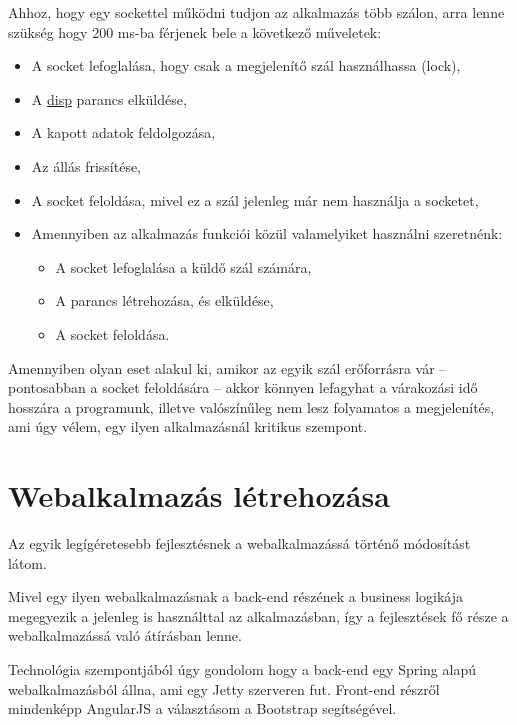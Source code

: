 \documentclass[a4paper,12pt]{report}
\begin{document}
\vspace{2mm}
Ahhoz, hogy egy sockettel működni tudjon az alkalmazás több szálon, arra lenne szükség hogy 200 ms-ba férjenek bele a következő műveletek:

\begin{itemize}
\item A socket lefoglalása, hogy csak a megjelenítő szál használhassa (lock),
\item A \url{disp} parancs elküldése,
\item A kapott adatok feldolgozása,
\item Az állás frissítése,
\item A socket feloldása, mivel ez a szál jelenleg már nem használja a socketet,
\item Amennyiben az alkalmazás funkciói közül valamelyiket használni szeretnénk:
	\begin{itemize}
	\item A socket lefoglalása a küldő szál számára,
	\item A parancs létrehozása, és elküldése,
	\item A socket feloldása.
	\end{itemize}
\end{itemize}

\vspace{2mm}
Amennyiben olyan eset alakul ki, amikor az egyik szál erőforrásra vár -- pontosabban a socket feloldására -- akkor könnyen lefagyhat a várakozási idő hosszára a programunk, illetve valószínűleg nem lesz folyamatos a megjelenítés, ami úgy vélem, egy ilyen alkalmazásnál kritikus szempont.

\section{Webalkalmazás létrehozása}

Az egyik legígéretesebb fejlesztésnek a webalkalmazássá történő módosítást látom.

\vspace{2mm}
Mivel egy ilyen webalkalmazásnak a back-end részének a business logikája megegyezik a jelenleg is használttal az alkalmazásban, így a fejlesztések fő része a webalkalmazássá való átírásban lenne.

\vspace{2mm}
Technológia szempontjából úgy gondolom hogy a back-end egy Spring \cite{spring} alapú webalkalmazásból állna, ami egy Jetty \cite{jetty} szerveren fut. Front-end részről mindenképp AngularJS \cite{angularjs} a választásom a Bootstrap \cite{bootstrap} segítségével.
\end{document}
